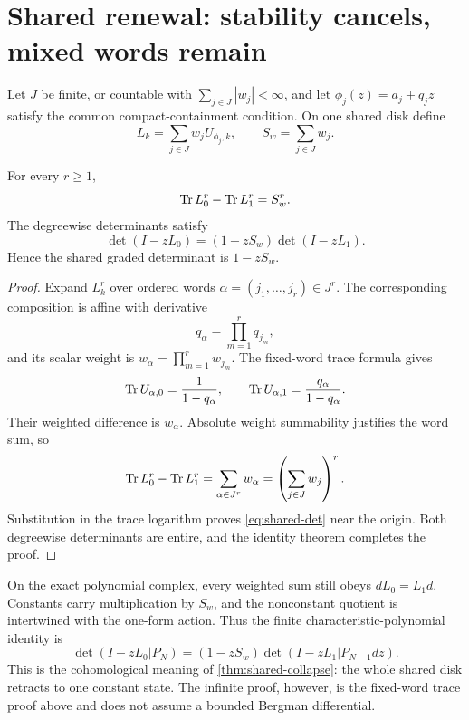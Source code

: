 \section{Shared renewal: stability cancels, mixed words remain}
\label{sec:shared}

Let \(J\) be finite, or countable with \(\sum_{j\in J}|w_j|<\infty\), and
let \(\phi_j(z)=a_j+q_jz\) satisfy the common compact-containment condition.
On one shared disk define
\[
        L_k=\sum_{j\in J}w_jU_{\phi_j,k},
        \qquad S_w=\sum_{j\in J}w_j.
\]

\begin{theorem}
\label{thm:shared-collapse}
For every \(r\ge1\),
\begin{equation}
        \operatorname{Tr} L_0^r-\operatorname{Tr} L_1^r=S_w^r.
 \label{eq:shared-supertrace}
\end{equation}
The degreewise determinants satisfy
\begin{equation}
        \det(I-zL_0)=(1-zS_w)\det(I-zL_1).
 \label{eq:shared-det}
\end{equation}
Hence the shared graded determinant is \(1-zS_w\).
\end{theorem}

\begin{proof}
Expand \(L_k^r\) over ordered words
\(\alpha=(j_1,\ldots,j_r)\in J^r\).  The corresponding composition is
affine with derivative
\[
        q_\alpha=\prod_{m=1}^rq_{j_m},
\]
and its scalar weight is
\(w_\alpha=\prod_{m=1}^rw_{j_m}\).  The fixed-word trace formula gives
\[
 \operatorname{Tr} U_{\alpha,0}=\frac1{1-q_\alpha},\qquad
 \operatorname{Tr} U_{\alpha,1}=\frac{q_\alpha}{1-q_\alpha}.
\]
Their weighted difference is \(w_\alpha\).  Absolute weight summability
justifies the word sum, so
\[
 \operatorname{Tr} L_0^r-\operatorname{Tr} L_1^r
 =\sum_{\alpha\in J^r}w_\alpha
 =\left(\sum_{j\in J}w_j\right)^r.
\]
Substitution in the trace logarithm proves \eqref{eq:shared-det} near the
origin.  Both degreewise determinants are entire, and the identity theorem
completes the proof.
\end{proof}

On the exact polynomial complex, every weighted sum still obeys
\(dL_0=L_1d\).  Constants carry multiplication by \(S_w\), and the
nonconstant quotient is intertwined with the one-form action.  Thus the
finite characteristic-polynomial identity is
\[
 \det(I-zL_0|P_N)
 =(1-zS_w)\det(I-zL_1|P_{N-1}dz).
\]
This is the cohomological meaning of \cref{thm:shared-collapse}: the whole
shared disk retracts to one constant state.  The infinite proof, however,
is the fixed-word trace proof above and does not assume a bounded Bergman
differential.

